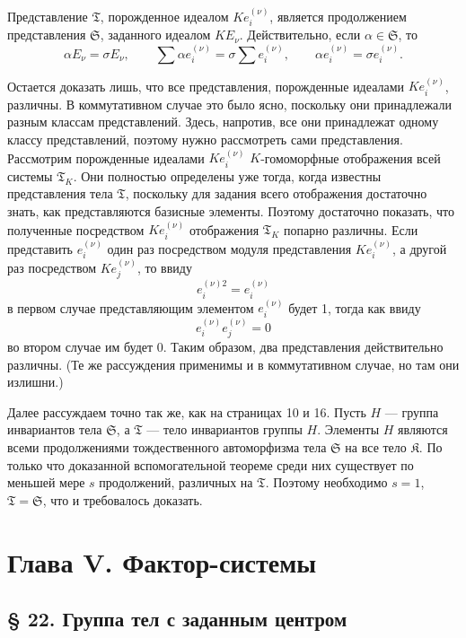 \documentclass[11pt]{article}
\begin{document}
Представление \(\mathfrak T\), порожденное идеалом \(K e_i^{(\nu)}\), является продолжением представления \(\mathfrak S\), заданного идеалом \(K E_\nu\). Действительно, если \(\alpha\in \mathfrak S\), то
\[
\alpha E_\nu=\sigma E_\nu,\qquad
\sum \alpha e_i^{(\nu)}=\sigma\sum e_i^{(\nu)},\qquad
\alpha e_i^{(\nu)}=\sigma e_i^{(\nu)}.
\]

Остается доказать лишь, что все представления, порожденные идеалами \(K e_i^{(\nu)}\), различны. В коммутативном случае это было ясно, поскольку они принадлежали разным классам представлений. Здесь, напротив, все они принадлежат одному классу представлений, поэтому нужно рассмотреть сами представления. Рассмотрим порожденные идеалами \(K e_i^{(\nu)}\) \(K\)-гомоморфные отображения всей системы \(\mathfrak T_K\). Они полностью определены уже тогда, когда известны представления тела \(\mathfrak T\), поскольку для задания всего отображения достаточно знать, как представляются базисные элементы. Поэтому достаточно показать, что полученные посредством \(K e_i^{(\nu)}\) отображения \(\mathfrak T_K\) попарно различны. Если представить \(e_i^{(\nu)}\) один раз посредством модуля представления \(K e_i^{(\nu)}\), а другой раз посредством \(K e_j^{(\nu)}\), то ввиду
\[
e_i^{(\nu)2}=e_i^{(\nu)}
\]
в первом случае представляющим элементом \(e_i^{(\nu)}\) будет 1, тогда как ввиду
\[
e_i^{(\nu)}e_j^{(\nu)}=0
\]
во втором случае им будет 0. Таким образом, два представления действительно различны. (Те же рассуждения применимы и в коммутативном случае, но там они излишни.)

Далее рассуждаем точно так же, как на страницах 10 и 16. Пусть \(H\) --- группа инвариантов тела \(\mathfrak S\), а \(\mathfrak T\) --- тело инвариантов группы \(H\). Элементы \(H\) являются всеми продолжениями тождественного автоморфизма тела \(\mathfrak S\) на все тело \(\mathfrak K\). По только что доказанной вспомогательной теореме среди них существует по меньшей мере \(s\) продолжений, различных на \(\mathfrak T\). Поэтому необходимо \(s=1\), \(\mathfrak T=\mathfrak S\), что и требовалось доказать.

\section*{Глава V. Фактор-системы}\label{kapitel-v.-faktorensysteme}

\subsection*{§ 22. Группа тел с заданным центром}\label{die-gruppe-der-koerper-mit-gegebenem-zentrum}
\end{document}

